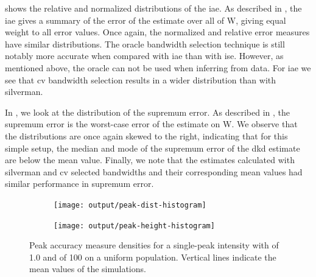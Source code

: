  shows the relative and normalized distributions of the \gls{iae}.
As described in ,
the \gls{iae} gives a summary of the error of the estimate over all of \gls{W},
giving equal weight to all error values.
Once again, the normalized and relative error measures have similar distributions.
The \gls{oracle} bandwidth selection technique is still notably more accurate when compared with \gls{iae} than with \gls{ise}.
However, as mentioned above, the \gls{oracle} can not be used when inferring from data.
For \gls{iae} we see that \gls{cv} bandwidth selection results in a wider distribution than with \gls{silverman}.

In , we look at the distribution of the \gls{supremum error}.
As described in ,
the \gls{supremum error} is the worst-case error of the estimate on \gls{W}.
We observe that the distributions are once again skewed to the right,
indicating that for this simple setup,
the median and mode of the \gls{supremum error} of the \gls{dkd} estimate are below the mean value.
Finally, we note that the estimates calculated with \gls{silverman} and \gls{cv}
selected bandwidths and their corresponding mean values had similar performance in \gls{supremum error}.


\begin{figure}[htbp]
    \centering
    \begin{subfigure}[b]{0.45\textwidth}
        \texttt{[image: output/peak-dist-histogram]}
        \label{fig:peaks:unif_100_1.0_1h:dist}
    \end{subfigure}
    \begin{subfigure}[b]{0.45\textwidth}
        \texttt{[image: output/peak-height-histogram]}
        \label{fig:peaks:unif_100_1.0_1h:height}
    \end{subfigure}
    \caption[Peak accuracy: Single-peak of 100 on uniform population]{Peak accuracy measure densities for a single-peak intensity with  of 1.0 and  of 100 on a uniform population. Vertical lines indicate the mean values of the simulations.}
    \label{fig:peaks:unif_100_1.0_1h}
\end{figure}

